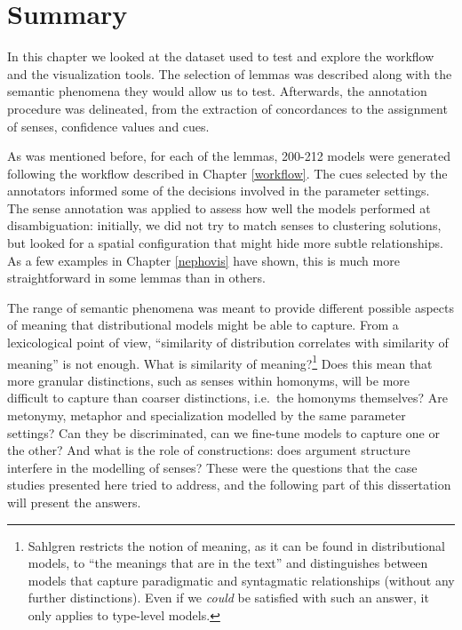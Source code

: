 \documentclass[
]{book}
\begin{document}
\hypertarget{ann-summary}{%
\section{Summary}\label{ann-summary}}

In this chapter we looked at the dataset used to test and explore the workflow and the visualization tools. The selection of lemmas was described along with the semantic phenomena they would allow us to test. Afterwards, the annotation procedure was delineated, from the extraction of concordances to the assignment of senses, confidence values and cues.

As was mentioned before, for each of the lemmas, 200-212 models were generated following the workflow described in Chapter \ref{workflow}. The cues selected by the annotators informed some of the decisions involved in the parameter settings. The sense annotation was applied to assess how well the models performed at disambiguation: initially, we did not try to match senses to clustering solutions, but looked for a spatial configuration that might hide more subtle relationships. As a few examples in Chapter \ref{nephovis} have shown, this is much more straightforward in some lemmas than in others.

The range of semantic phenomena was meant to provide different possible aspects of meaning that distributional models might be able to capture. From a lexicological point of view, ``similarity of distribution correlates with similarity of meaning'' is not enough. What is similarity of meaning?\footnote{Sahlgren restricts the notion of meaning, as it can be found in distributional models, to ``the meanings that are in the text'' \autocite*[49]{sahlgren_2008} and distinguishes between models that capture paradigmatic and syntagmatic relationships (without any further distinctions). Even if we \emph{could} be satisfied with such an answer, it only applies to type-level models.} Does this mean that more granular distinctions, such as senses within homonyms, will be more difficult to capture than coarser distinctions, i.e.~the homonyms themselves? Are metonymy, metaphor and specialization modelled by the same parameter settings? Can they be discriminated, can we fine-tune models to capture one or the other? And what is the role of constructions: does argument structure interfere in the modelling of senses?
These were the questions that the case studies presented here tried to address, and the following part of this dissertation will present the answers.
\end{document}
